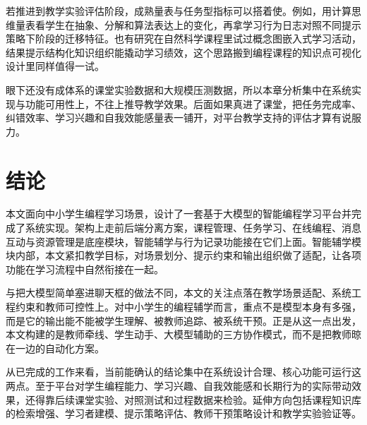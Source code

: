 若推进到教学实验评估阶段，成熟量表与任务型指标可以搭着使。例如，用计算思维量表看学生在抽象、分解和算法表达上的变化\cite{tsai2021cts}，再拿学习行为日志对照不同提示策略下阶段的迁移特征\cite{sun2023transitioning}。也有研究在自然科学课程里试过概念图嵌入式学习活动，结果提示结构化知识组织能撬动学习绩效，这个思路搬到编程课程的知识点可视化设计里同样值得一试\cite{hwang2013conceptmap}。

眼下还没有成体系的课堂实验数据和大规模压测数据，所以本章分析集中在系统实现与功能可用性上，不往上推导教学效果。后面如果真进了课堂，把任务完成率、纠错效率、学习兴趣和自我效能感量表一铺开，对平台教学支持的评估才算有说服力\cite{tang2025middleschool}。


\chapter{结论}

本文面向中小学生编程学习场景，设计了一套基于大模型的智能编程学习平台并完成了系统实现。架构上走前后端分离方案，课程管理、任务学习、在线编程、消息互动与资源管理是底座模块，智能辅学与行为记录功能接在它们上面。智能辅学模块内部，本文紧扣教学目标，对场景划分、提示约束和输出组织做了适配，让各项功能在学习流程中自然衔接在一起。

与把大模型简单塞进聊天框的做法不同，本文的关注点落在教学场景适配、系统工程约束和教师可控性上。对中小学生的编程辅学而言，重点不是模型本身有多强，而是它的输出能不能被学生理解、被教师追踪、被系统干预。正是从这一点出发，本文构建的是教师牵线、学生动手、大模型辅助的三方协作模式，而不是把教师晾在一边的自动化方案。

从已完成的工作来看，当前能确认的结论集中在系统设计合理、核心功能可运行这两点。至于平台对学生编程能力、学习兴趣、自我效能感和长期行为的实际带动效果，还得靠后续课堂实验、对照测试和过程数据来检验。延伸方向包括课程知识库的检索增强、学习者建模、提示策略评估、教师干预策略设计和教学实验验证等。
